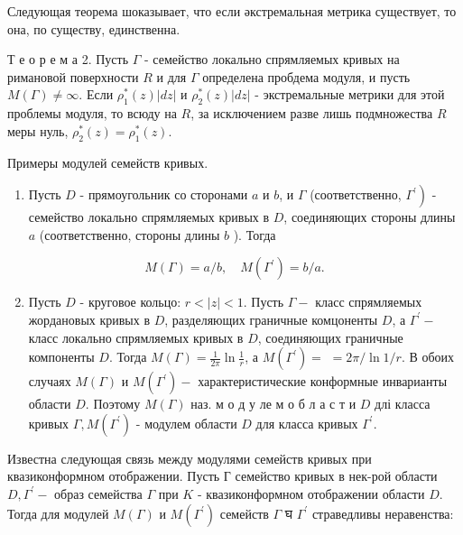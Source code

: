\documentclass[10pt]{article}
\begin{document}
Следующая теорема шоказывает, что если әкстремальная метрика существует, то она, по существу, единственна.



Т е о р е м а 2. Пусть $\Gamma$ - семейство локально спрямляемых кривых на римановой поверхности $R$ и для $\Gamma$ определена пробдема модуля, и пусть $M(\Gamma) \neq \infty$. Если $\rho_{1}^{*}(z)|d z|$ и $\rho_{2}^{*}(z)|d z|$ - экстремальные метрики для этой проблемы модуля, то всюду на $R$, за исключением разве лишь подмножества $R$ меры нуль, $\rho_{2}^{*}(z)=\rho_{1}^{*}(z)$.



Примеры модулей семейств кривых.



\begin{enumerate}

  \item Пусть $D$ - прямоугольник со сторонами $a$ и $b$, и $\Gamma$ (соответственно, $\left.\Gamma^{\prime}\right)$ - семейство локально спрямляемых кривых в $D$, соединяющих стороны длины $a$ (соответственно, стороны длины $b$ ). Тогда

\end{enumerate}



\[

M(\Gamma)=a / b, \quad M\left(\Gamma^{\prime}\right)=b / a .

\]



\begin{enumerate}

  \setcounter{enumi}{1}

  \item Пусть $D$ - круговое кольцо: $r<|z|<1$. Пусть $\Gamma-$ класс спрямляемых жордановых кривых в $D$, разделяющих граничные комцоненты $D$, а $\Gamma^{\prime}-$ класс локально спрямляемых кривых в $D$, соединяющих граничные компоненты $D$. Тогда $M(\Gamma)=\frac{1}{2 \pi} \ln \frac{1}{r}$, а $M\left(\Gamma^{\prime}\right)=$ $=2 \pi / \ln 1 / r$. В обоих случаях $M(\Gamma)$ и $M\left(\Gamma^{\prime}\right)-$ характеристические конформные инварианты области $D$. Поэтому $M(\Gamma)$ наз. м о д у ле м о б л а с т и $D$ длі класса кривых $\Gamma, M\left(\Gamma^{\prime}\right)$ - модулем области $D$ для класса кривых $\Gamma^{\prime}$.

\end{enumerate}



Известна следующая связь между модулями семейств кривых при квазиконформном отображении. Пусть Г семейство кривых в нек-рой области $D, \Gamma^{\prime}-$ образ семейства $\Gamma$ при $K$ - квазиконформном отображении области $D$. Тогда для модулей $M(\Gamma)$ и $M\left(\Gamma^{\prime}\right)$ семейств $\Gamma$ घ $\Gamma^{\prime}$ страведливы неравенства:
\end{document}
